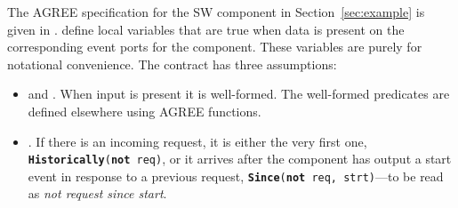 




The AGREE specification for the SW component in
Section~\ref{sec:example} is given in .
 define
local variables that are true when data is present on the
corresponding event ports for the component.  These variables are
purely for notational convenience. The contract has three assumptions:
\begin{itemize}
\item {} and .
When input is present it is well-formed. The well-formed predicates
are defined elsewhere using AGREE functions.

\item {}. If there is an incoming request,
it is either the very first one, \texttt{\textbf{Historically}(\textbf{not} req)},
or it arrives after the component has output a start event in response to a previous
request, \texttt{\textbf{Since}(\textbf{not} req, strt)}---to be read as \emph{not
request since start}.
\end{itemize}

